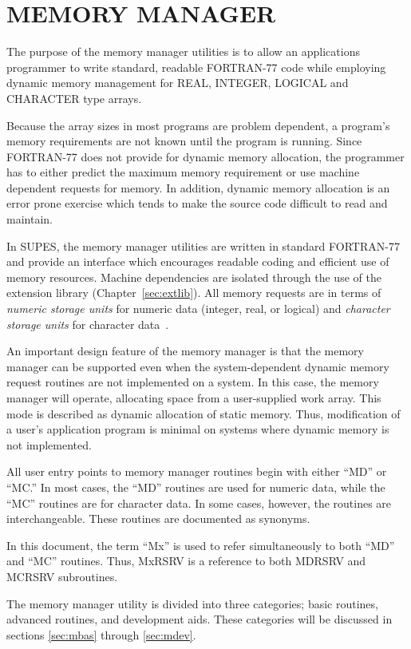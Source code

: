 \chapter{MEMORY MANAGER}
The purpose of the memory manager utilities is to allow an applications
programmer to write standard, readable FORTRAN-77 code while employing
dynamic memory management for REAL, INTEGER, LOGICAL and CHARACTER type
arrays.

Because the array sizes in most programs are problem dependent, a
program's memory requirements are not known until the program is running.
Since FORTRAN-77 does not provide for dynamic memory allocation, the
programmer has to either predict the maximum memory requirement or use
machine dependent requests for memory.  In addition, dynamic memory
allocation is an error prone exercise which tends to make the source code
difficult to read and maintain.

In SUPES, the memory manager utilities are written in standard FORTRAN-77
and provide an interface which encourages readable coding and efficient use
of memory resources.  Machine dependencies are isolated through the use of
the extension library (Chapter~\ref{sec:extlib}). All memory
requests are in terms of {\em numeric storage units} for numeric data
(integer, real, or logical) and {\em character storage units} for
character data~\cite{ansi}.

An important design feature of the memory manager is that the memory manager
can be supported even when the system-dependent dynamic memory request
routines are not implemented on a system.  In this case, the memory manager
will operate, allocating space from a user-supplied work array.  This mode
is described as dynamic allocation of static memory. Thus, modification of a
user's application program is minimal on systems where dynamic memory is not
implemented.

All user entry points to memory manager routines begin with either ``MD''
or ``MC.'' In most cases, the ``MD'' routines are used for numeric data,
while the ``MC'' routines are for character data. In some cases, however,
the routines are interchangeable. These routines are documented as synonyms.

In this document, the term ``Mx'' is used to refer simultaneously to
both ``MD'' and ``MC'' routines. Thus, MxRSRV is a reference to both MDRSRV
and MCRSRV subroutines.

The memory manager utility is divided into three categories; basic routines,
advanced routines, and development aids.  These categories will be discussed
in sections \ref{sec:mbas} through \ref{sec:mdev}.


